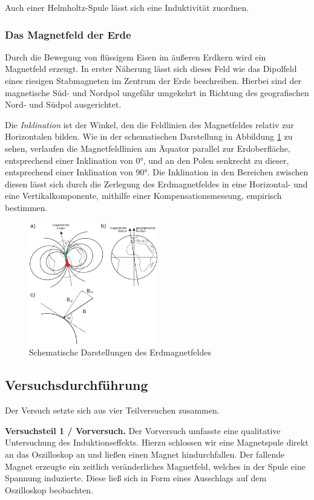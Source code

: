 Auch einer Helmholtz-Spule lässt sich eine Induktivität zuordnen.
\newpage\noindent
\subsubsection{Das Magnetfeld der Erde}

Durch die Bewegung von flüssigem Eisen im äußeren Erdkern wird ein Magnetfeld erzeugt. In erster Näherung lässt sich dieses Feld wie das Dipolfeld eines riesigen Stabmagneten im Zentrum der Erde beschreiben. Hierbei sind der magnetische Süd- und Nordpol ungefähr umgekehrt in Richtung des geografischen Nord- und Südpol ausgerichtet.

 Die \textit{Inklination} ist der Winkel, den die Feldlinien des Magnetfeldes relativ zur Horizontalen bilden. Wie in der schematischen Darstellung in Abbildung \ref{fig:erdmagnetfeld} zu sehen, verlaufen die Magnetfeldlinien am Äquator parallel zur Erdoberfläche, entsprechend einer Inklination von 0°, und an den Polen senkrecht zu dieser, entsprechend einer Inklination von 90°. Die Inklination in den Bereichen zwischen diesen lässt sich durch die Zerlegung des Erdmagnetfeldes in eine Horizontal- und eine Vertikalkomponente, mithilfe einer Kompensationsmessung, empirisch bestimmen.

\begin{figure}[H]
  \centering
  \includegraphics[width=0.5\textwidth]{files/erdmagnetfeld.png}
  \caption{Schematische Darstellungen des Erdmagnetfeldes}
  \label{fig:erdmagnetfeld}
\end{figure}
\newpage\noindent
\subsection{Versuchsdurchführung}

Der Versuch setzte sich aus vier Teilversuchen zusammen.

\textbf{Versuchsteil 1 / Vorversuch.} Der Vorversuch umfasste eine qualitative Untersuchung des Induktionseffekts. Hierzu schlossen wir eine Magnetspule direkt an das Oszilloskop an und ließen einen Magnet hindurchfallen. Der fallende Magnet erzeugte ein zeitlich veränderliches Magnetfeld, welches in der Spule eine Spannung induzierte. Diese ließ sich in Form eines Ausschlags auf dem Oszilloskop beobachten.

